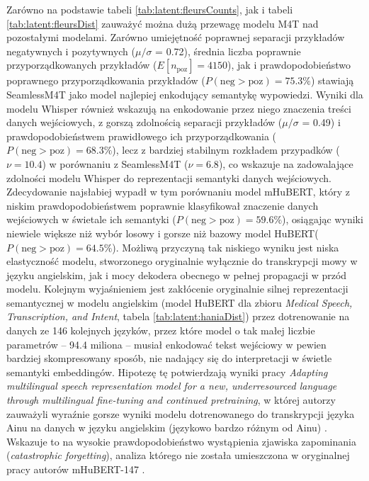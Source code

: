 Zarówno na podstawie tabeli \ref{tab:latent:fleursCounts}, jak i tabeli \ref{tab:latent:fleursDist} zauważyć można dużą przewagę modelu M4T nad pozostałymi modelami. Zarówno umiejętność poprawnej separacji przykładów negatywnych i pozytywnych ($\mu/\sigma$ = 0.72), średnia liczba poprawnie przyporządkowanych przykładów ($E[n_\text{poz}] = 4150$), jak i prawdopodobieństwo poprawnego przyporządkowania przykładów ($P(\text{neg} > \text{poz}) = 75.3\%$) stawiają SeamlessM4T jako model najlepiej enkodujący semantykę wypowiedzi. Wyniki dla modelu Whisper również wskazują na enkodowanie przez niego znaczenia treści danych wejściowych, z gorszą zdolnością separacji przykładów ($\mu/\sigma$ = 0.49) i prawdopodobieństwem prawidłowego ich przyporządkowania ($P(\text{neg} > \text{poz}) = 68.3\%$), lecz z bardziej stabilnym rozkładem przypadków ($\nu = 10.4$) w porównaniu z SeamlessM4T ($\nu = 6.8$), co wskazuje na zadowalające zdolności modelu Whisper do reprezentacji semantyki danych wejściowych. Zdecydowanie najsłabiej wypadł w tym porównaniu model mHuBERT, który z niskim prawdopodobieństwem poprawnie klasyfikował znaczenie danych wejściowych w świetale ich semantyki ($P(\text{neg} > \text{poz}) = 59.6\%$), osiągając wyniki niewiele większe niż wybór losowy i gorsze niż bazowy model HuBERT($P(\text{neg} > \text{poz}) = 64.5\%$). Możliwą przyczyną tak niskiego wyniku jest niska elastyczność modelu, stworzonego oryginalnie wyłącznie do transkrypcji mowy w języku angielskim, jak i mocy dekodera obecnego w pełnej propagacji w przód modelu. Kolejnym wyjaśnieniem jest zakłócenie oryginalnie silnej reprezentacji semantycznej w modelu angielskim (model HuBERT dla zbioru \textit{Medical Speech, Transcription, and Intent}, tabela \ref{tab:latent:haniaDist}) przez dotrenowanie na danych ze 146 kolejnych języków, przez które model o tak małej liczbie parametrów -- 94.4 miliona -- musiał enkodować tekst wejściowy w pewien bardziej skompresowany sposób, nie nadający się do interpretacji w świetle semantyki embeddingów. Hipotezę tę potwierdzają wyniki pracy \textit{Adapting multilingual speech representation model for a new, underresourced language through multilingual fine-tuning and continued pretraining}, w której autorzy zauważyli wyraźnie gorsze wyniki modelu dotrenowanego do transkrypcji języka Ainu na danych w języku angielskim (językowo bardzo różnym od Ainu) \cite{latentBreakMultilingual}. Wskazuje to na wysokie prawdopodobieństwo wystąpienia zjawiska zapominania (\textit{catastrophic forgetting}), analiza którego nie została umieszczona w oryginalnej pracy autorów mHuBERT-147 \cite{mhubert}.


